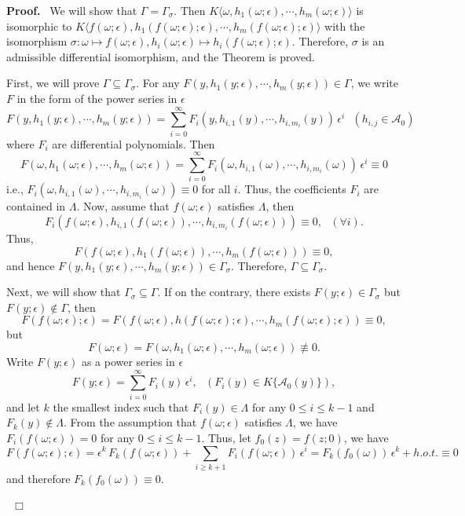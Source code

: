 \documentclass[preprint, 12pt]{elsarticle}
\numberwithin{equation}{section}
\newenvironment{proof}[1][Proof]{\textbf{#1.}\ }{\ $\Box$}
\newcommand{\A}{\mathcal{A}}
\begin{document}
\begin{proof}
We will show that $\Gamma = \Gamma_\sigma$.
Then $K\langle \omega, h_1(\omega;\epsilon), \cdots,
h_m(\omega;\epsilon)\rangle$ is isomorphic to $K\langle
f(\omega;\epsilon), h_1(f(\omega;\epsilon);\epsilon), \cdots,
h_m(f(\omega;\epsilon);\epsilon)\rangle$ with the isomorphism
$\sigma:\omega\mapsto f(\omega;\epsilon),
h_i(\omega;\epsilon)\mapsto h_i(f(\omega;\epsilon);\epsilon)$.
Therefore, $\sigma$ is an admissible differential isomorphism, and the Theorem is proved. 

First, we will prove $\Gamma \subseteq \Gamma_\sigma$. For any $F(y,h_1(y;\epsilon),\cdots,h_m(y;\epsilon))\in \Gamma$, we write $F$ in the form of the power series in $\epsilon$
$$
F(y,h_1(y;\epsilon),\cdots,h_m(y;\epsilon)) = \sum_{i =
0}^{\infty}F_i(y,h_{i,1}(y),\cdots,h_{i,m_i}(y))\,\epsilon^i\ \ \
(h_{i,j}\in \A_0)
$$ where $F_i$ are differential polynomials. Then
$$F(\omega,h_1(\omega;\epsilon),\cdots,h_m(\omega;\epsilon)) = \sum_{i =
0}^{\infty}F_i(\omega,h_{i,1}(\omega),\cdots,h_{i,m_i}(\omega))\,\epsilon^i\equiv 0$$
i.e., $F_i(\omega,h_{i,1}(\omega),\cdots,h_{i,m_i}(\omega)) \equiv 0$ for all $i$.
Thus, the coefficients $F_i$ are contained in $\Lambda$. Now,
assume that $f(\omega;\epsilon)$ satisfies $\Lambda$, then
$$F_i(f(\omega;\epsilon),h_{i,1}(f(\omega;\epsilon)),\cdots,h_{i,m_i}(f(\omega;\epsilon))) \equiv 0,\ \ \ (\forall i).$$
Thus,
$$F(f(\omega;\epsilon),h_1(f(\omega;\epsilon)),\cdots,h_m(f(\omega;\epsilon))) \equiv 0,$$
and hence $F(y,h_1(y;\epsilon),\cdots,h_m(y;\epsilon))\in
\Gamma_\sigma$. Therefore, $\Gamma\subseteq\Gamma_\sigma$.

Next, we will show that $\Gamma_\sigma\subseteq \Gamma$. If on the
contrary, there exists $F(y;\epsilon)\in \Gamma_\sigma$ but
$F(y;\epsilon)\not\in \Gamma$, then
$$F(f(\omega; \epsilon);\epsilon) =
F(f(\omega;\epsilon),h(f(\omega;\epsilon);\epsilon),\cdots,h_m(f(\omega;\epsilon);\epsilon)) \equiv 0,$$ 
but
$$F(\omega;
\epsilon) = F(\omega,
h_1(\omega;\epsilon),\cdots,h_m(\omega;\epsilon)) \not\equiv 0.$$
Write $F(y;\epsilon)$ as a power series in $\epsilon$
$$F(y;\epsilon) = \sum_{i = 0}^{\infty}F_i(y)\,\epsilon^i,\ \ \ (F_i(y)\in K\{\A_0(y)\}),$$
and let $k$ the smallest index such that $F_i(y)\in \Lambda$
for any $0\leq i \leq k-1$ and $F_k(y)\not\in\Lambda$. From the
assumption that $f(\omega;\epsilon)$ satisfies $\Lambda$, we have
$F_i(f(\omega;\epsilon)) = 0$ for any $0 \leq i\leq k-1$. Thus,
let $f_0(z) = f(z;0)$, we have
$$F(f(\omega;\epsilon);\epsilon) = \epsilon^k\,F_k(f(\omega;\epsilon)) +
\sum_{i \geq  k+1}F_i(f(\omega;\epsilon))\,\epsilon^{i} =
F_k(f_0(\omega))\,\epsilon^k + h.o.t. \equiv 0$$
and therefore $F_k(f_0(\omega)) \equiv 0$.


\end{proof}
\end{document}
